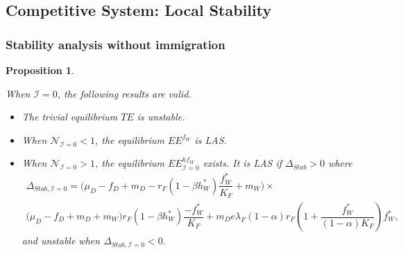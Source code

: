 \documentclass{article}
\newcommand{\lfw}{\lambda_{F}}
\newcommand{\lfw}{\lambda_{F}}
\newcommand{\cI}{\mathcal{I}}
\newtheorem{prop}[theorem]{Proposition}
\theoremstyle{definition}
\theoremstyle{remark}
\begin{document}
\subsection{Competitive System: Local Stability}

\subsubsection{Stability analysis without immigration}
\begin{prop}\label{prop:stab, cI=0}

 When $\cI = 0$, the following results are valid.
\begin{itemize}
\item The trivial equilibrium $TE$ is unstable.
\item When $\mathcal{N}_{\cI = 0} < 1$, the equilibrium $EE^{f_W}$ is LAS.
\item When $\mathcal{N}_{\cI = 0} > 1$, the equilibrium $EE^{hf_W}_{\cI =0}$ exists. It is LAS if $\Delta_{Stab} > 0$ where 
\begin{multline}
\Delta_{Stab, \cI =0} = \Big(\mu_D - f_D + m_D - r_F (1-\beta h_W^*) \dfrac{f_W^*}{K_F} + m_W\Big) \times \\ \big( \mu_D  -f_D + m_D + m_W \big) r_F(1 - \beta h_W^*) \dfrac{-f^*_W}{K_F} + 
m_D e \lfw (1- \alpha) r_F \left(1 + \dfrac{f_W^*}{(1- \alpha)K_F}\right) f_W^*,
\label{eq:deltaStab, I=0}
\end{multline}
and unstable when $\Delta_{Stab, \cI =0} < 0.$
\end{itemize}
\end{prop}
\end{document}
